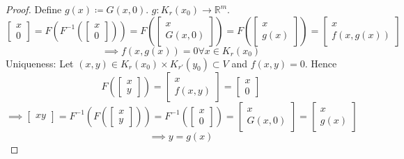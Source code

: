 \documentclass{article}
\begin{document}
\begin{proof}
  Define $g(x) \coloneqq G(x, 0)$. $g: K_r(x_0) \to \mathbb R^m$.
  \[ \begin{bmatrix} x \\ 0 \end{bmatrix} = F\left(F^{-1}\left(\begin{bmatrix} x \\ 0 \end{bmatrix}\right)\right) = F\left(\begin{bmatrix} x \\ G(x, 0) \end{bmatrix}\right) = F\left(\begin{bmatrix} x \\ g(x) \end{bmatrix}\right) = \begin{bmatrix} x \\ f(x, g(x)) \end{bmatrix} \]
  \[ \implies f(x, g(x)) = 0 \forall x \in K_r(x_0) \]
  Uniqueness: Let $(x, y) \in K_r(x_0) \times K_{r'}(y_0) \subset V$ and $f(x, y) = 0$.
  Hence
  \[ F(\begin{bmatrix} x \\ y \end{bmatrix}) = \begin{bmatrix} x \\ f(x, y) \end{bmatrix} = \begin{bmatrix} x \\ 0 \end{bmatrix} \]
  \[ \implies \begin{bmatrix} xy \end{bmatrix} = F^{-1}(F(\begin{bmatrix} x \\ y \end{bmatrix})) = F^{-1}(\begin{bmatrix} x \\ 0 \end{bmatrix}) = \begin{bmatrix} x \\ G(x,0) \end{bmatrix} = \begin{bmatrix} x \\ g(x) \end{bmatrix} \]
  \[ \implies y = g(x) \]
\end{proof}
\end{document}
